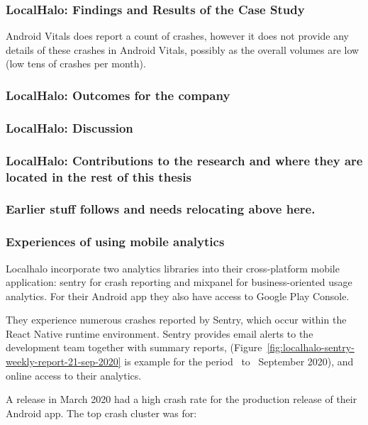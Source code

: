 \subsubsection{LocalHalo: Findings and Results of the Case Study}
Android Vitals does report a count of crashes, however it does not provide any details of these crashes in Android Vitals, possibly as the overall volumes are low (low tens of crashes per month).


\subsubsection{LocalHalo: Outcomes for the company}


\subsubsection{LocalHalo: Discussion}


\subsubsection{LocalHalo: Contributions to the research and where they are located in the rest of this thesis}

\subsubsection{Earlier stuff follows and needs relocating above here.}



\subsubsection{Experiences of using mobile analytics}
Localhalo incorporate two analytics libraries into their cross-platform mobile application: sentry for crash reporting and mixpanel for business-oriented usage analytics. For their Android app they also have access to Google Play Console.

They experience numerous crashes reported by Sentry, which occur within the React Native runtime environment. Sentry provides email alerts to the development team together with summary reports, (Figure~\ref{fig:localhalo-sentry-weekly-report-21-sep-2020} is example for the period~ to~ September 2020), and online access to their analytics.

A release in March 2020 had a high crash rate for the production release of their Android app. The top crash cluster was for:

